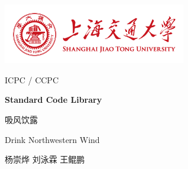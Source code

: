 \documentclass[onecolumn,a4paper]{article}
\begin{document}
\begin{titlepage}
	\begin{center}
		\includegraphics*[width=8cm]{icon-sjtu.png}

		\vspace{2cm}
	
		{\huge ICPC / CCPC}
		
		{\Huge\bfseries Standard Code Library}
		
		\vspace{5cm}

		{\fontsize{48pt}{48pt}\selectfont 吸风饮露}

		\vspace{0.5cm}

		{\fontsize{15pt}{15pt}\selectfont Drink Northwestern Wind}

		\vspace{2cm}

		{\huge 杨崇烨 \hspace{1cm} 刘泳霖 \hspace{1cm} 王鲲鹏}

		\vspace{1cm}
	\end{center}
\end{titlepage}

\begin{multicols*}{2}
	\tableofcontents
\end{multicols*}

\begin{multicols}{2}

	

	

	

	

	

	

\end{multicols}
	
\end{document}
